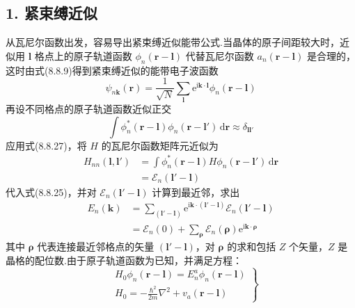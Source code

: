 \subsection*{1. 紧束缚近似}

从瓦尼尔函数出发，容易导出紧束缚近似能带公式.当晶体的原子间距较大时，近似用 $\boldsymbol{l}$ 格点上的原子轨道函数 $\phi_{n}(\boldsymbol{r}-\boldsymbol{l})$ 代替瓦尼尔函数 $a_{n}(\boldsymbol{r}-\boldsymbol{l})$ 是合理的，这时由式(8.8.9)得到紧束缚近似的能带电子波函数
\begin{equation}
  \psi_{n\boldsymbol{k}}(\boldsymbol{r})=\frac{1}{\sqrt{N}}\sum_{\boldsymbol{l}}\mathrm{e}^{\mathrm{i}\boldsymbol{k}\cdot\boldsymbol{l}}\phi_{n}(\boldsymbol{r}-\boldsymbol{l})
\end{equation}
再设不同格点的原子轨道函数近似正交
\begin{equation}
  \int\phi_{n}^{*}(\boldsymbol{r}-\boldsymbol{l})\phi_{n}(\boldsymbol{r}-\boldsymbol{l}')\,\mathrm{d}\boldsymbol{r}\approx\delta_{\boldsymbol{l}\boldsymbol{l}'}
\end{equation}
应用式(8.8.27)，将 $H$ 的瓦尼尔函数矩阵元近似为
\begin{equation}
\begin{aligned}
  H_{nn}(\boldsymbol{l},\boldsymbol{l}')
  &=\int\phi_{n}^{*}(\boldsymbol{r}-\boldsymbol{l})H\phi_{n}(\boldsymbol{r}-\boldsymbol{l}')\,\mathrm{d}\boldsymbol{r}\\
  &=\mathscr{E}_{n}(\boldsymbol{l}'-\boldsymbol{l})
\end{aligned}
\end{equation}
代入式(8.8.25)，并对 $\mathscr{E}_{n}(\boldsymbol{l}'-\boldsymbol{l})$ 计算到最近邻，求出
\begin{equation}
\begin{aligned}
  E_{n}(\boldsymbol{k})
  &=\sum_{(\boldsymbol{l}'-\boldsymbol{l})}\mathrm{e}^{\mathrm{i}\boldsymbol{k}\cdot(\boldsymbol{l}'-\boldsymbol{l})}\mathscr{E}_{n}(\boldsymbol{l}'-\boldsymbol{l})\\
  &=\mathscr{E}_{n}(0)+\sum_{\boldsymbol{\rho}}\mathscr{E}_{n}(\boldsymbol{\rho})\mathrm{e}^{\mathrm{i}\boldsymbol{k}\cdot\boldsymbol{\rho}}
\end{aligned}
\end{equation}
其中 $\boldsymbol{\rho}$ 代表连接最近邻格点的矢量 $(\boldsymbol{l}'-\boldsymbol{l})$，对 $\boldsymbol{\rho}$ 的求和包括 $Z$ 个矢量，$Z$ 是晶格的配位数.由于原子轨道函数为已知，并满足方程：
\begin{equation}
  \left.
  \begin{aligned}
    &H_{0}\phi_{n}(\boldsymbol{r}-\boldsymbol{l})=E_{n}^{a}\phi_{n}(\boldsymbol{r}-\boldsymbol{l})\\[0.3em]
    &H_{0}=-\frac{\hbar^{2}}{2m}\nabla^{2}+v_{a}(\boldsymbol{r}-\boldsymbol{l})
  \end{aligned}\right\}
\end{equation}
